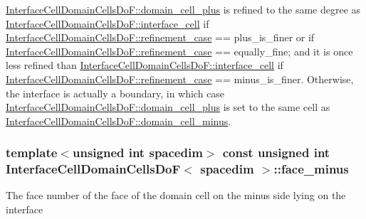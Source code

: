 \hyperlink{class_interface_cell_domain_cells_do_f_a8fd9dbd3a1e53023ecca7917b004bab1}{Interface\+Cell\+Domain\+Cells\+Do\+F\+::domain\+\_\+cell\+\_\+plus} is refined to the same degree as \hyperlink{class_interface_cell_domain_cells_do_f_a5fe7922af91545598d89c77ba42a59da}{Interface\+Cell\+Domain\+Cells\+Do\+F\+::interface\+\_\+cell} if \hyperlink{class_interface_cell_domain_cells_do_f_aebb7e5f13d079fc83f98f67bcfcc6de3}{Interface\+Cell\+Domain\+Cells\+Do\+F\+::refinement\+\_\+case} == {\ttfamily plus\+\_\+is\+\_\+finer} or if \hyperlink{class_interface_cell_domain_cells_do_f_aebb7e5f13d079fc83f98f67bcfcc6de3}{Interface\+Cell\+Domain\+Cells\+Do\+F\+::refinement\+\_\+case} == {\ttfamily equally\+\_\+fine}; and it is once less refined than \hyperlink{class_interface_cell_domain_cells_do_f_a5fe7922af91545598d89c77ba42a59da}{Interface\+Cell\+Domain\+Cells\+Do\+F\+::interface\+\_\+cell} if \hyperlink{class_interface_cell_domain_cells_do_f_aebb7e5f13d079fc83f98f67bcfcc6de3}{Interface\+Cell\+Domain\+Cells\+Do\+F\+::refinement\+\_\+case} == {\ttfamily minus\+\_\+is\+\_\+finer}. Otherwise, the interface is actually a boundary, in which case \hyperlink{class_interface_cell_domain_cells_do_f_a8fd9dbd3a1e53023ecca7917b004bab1}{Interface\+Cell\+Domain\+Cells\+Do\+F\+::domain\+\_\+cell\+\_\+plus} is set to the same cell as \hyperlink{class_interface_cell_domain_cells_do_f_ac8c84df4298d2d5be54dc8bf81e48c4b}{Interface\+Cell\+Domain\+Cells\+Do\+F\+::domain\+\_\+cell\+\_\+minus}. 
\subsubsection[{\texorpdfstring{face\+\_\+minus}{face_minus}}]{\setlength{\rightskip}{0pt plus 5cm}template$<$unsigned int spacedim$>$ const unsigned int {\bf Interface\+Cell\+Domain\+Cells\+DoF}$<$ spacedim $>$\+::face\+\_\+minus}\hypertarget{class_interface_cell_domain_cells_do_f_a01fc12497d44b06c7a325ea8f0b2ad28}{}\label{class_interface_cell_domain_cells_do_f_a01fc12497d44b06c7a325ea8f0b2ad28}
The face number of the face of the domain cell on the minus side lying on the interface 
